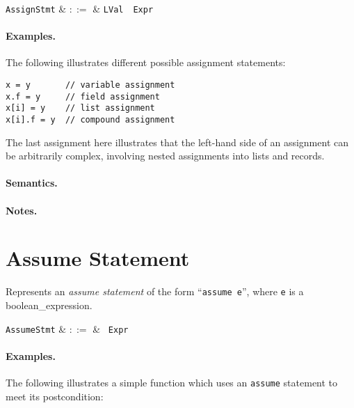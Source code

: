 \begin{syntax}
  \verb+AssignStmt+ & $::=$ & \verb+LVal+\ \token{=}\ \verb+Expr+\\
\end{syntax}


\paragraph{Examples.} The following illustrates different possible assignment statements:
\begin{lstlisting}
x = y       // variable assignment
x.f = y     // field assignment
x[i] = y    // list assignment
x[i].f = y  // compound assignment
\end{lstlisting}

The last assignment here illustrates that the left-hand side of an
assignment can be arbitrarily complex, involving nested assignments
into lists and records.

\paragraph{Semantics.}

\paragraph{Notes.} 


\section{Assume Statement}

Represents an {\em assume statement} of the form ``\lstinline{assume e}'', where \lstinline{e} is a \gls{boolean_expression}.

\begin{syntax}
  \verb+AssumeStmt+ & $::=$ & \ \verb+Expr+\\
\end{syntax}


\paragraph{Examples.}  The following illustrates a simple function
which uses an \lstinline{assume} statement to meet its
postcondition:

